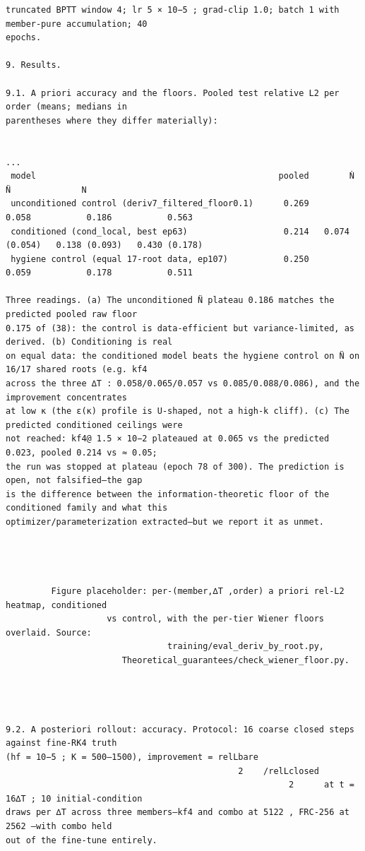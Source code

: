 \documentclass[letterpaper]{article}
\begin{document}
\begin{Verbatim}[fontsize=\fontsize{6.35}{7.15}\selectfont,breaklines=false]
truncated BPTT window 4; lr 5 × 10−5 ; grad-clip 1.0; batch 1 with member-pure accumulation; 40
epochs.

9. Results.

9.1. A priori accuracy and the floors. Pooled test relative L2 per order (means; medians in
parentheses where they differ materially):

                                                                                                    ...
 model                                                pooled        Ṅ              N̈              N
 unconditioned control (deriv7_filtered_floor0.1)      0.269       0.058           0.186           0.563
 conditioned (cond_local, best ep63)                   0.214   0.074 (0.054)   0.138 (0.093)   0.430 (0.178)
 hygiene control (equal 17-root data, ep107)           0.250       0.059           0.178           0.511

Three readings. (a) The unconditioned N̈ plateau 0.186 matches the predicted pooled raw floor
0.175 of (38): the control is data-efficient but variance-limited, as derived. (b) Conditioning is real
on equal data: the conditioned model beats the hygiene control on N̈ on 16/17 shared roots (e.g. kf4
across the three ∆T : 0.058/0.065/0.057 vs 0.085/0.088/0.086), and the improvement concentrates
at low κ (the ε(κ) profile is U-shaped, not a high-k cliff). (c) The predicted conditioned ceilings were
not reached: kf4@ 1.5 × 10−2 plateaued at 0.065 vs the predicted 0.023, pooled 0.214 vs ≈ 0.05;
the run was stopped at plateau (epoch 78 of 300). The prediction is open, not falsified—the gap
is the difference between the information-theoretic floor of the conditioned family and what this
optimizer/parameterization extracted—but we report it as unmet.




         Figure placeholder: per-(member,∆T ,order) a priori rel-L2 heatmap, conditioned
                    vs control, with the per-tier Wiener floors overlaid. Source:
                                training/eval_deriv_by_root.py,
                       Theoretical_guarantees/check_wiener_floor.py.




9.2. A posteriori rollout: accuracy. Protocol: 16 coarse closed steps against fine-RK4 truth
(hf = 10−5 ; K = 500–1500), improvement = relLbare
                                              2    /relLclosed
                                                        2      at t = 16∆T ; 10 initial-condition
draws per ∆T across three members—kf4 and combo at 5122 , FRC-256 at 2562 —with combo held
out of the fine-tune entirely.


\end{Verbatim}
\end{document}
